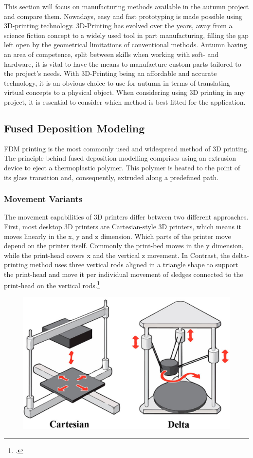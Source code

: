 This section will focus on manufacturing methods available in the autumn project and compare them. Nowadays, easy and fast prototyping is made possible using 3D-printing technology. 3D-Printing has evolved over the years, away from a science fiction concept to a widely used tool in part manufacturing, filling the gap left open by the geometrical limitations of conventional methods.\newline
Autumn having an area of competence, split between skills when working with soft- and hardware, it is vital to have the means to manufacture custom parts tailored to the project's needs. With 3D-Printing being an affordable and accurate technology, it is an obvious choice to use for autumn in terms of translating virtual concepts to a physical object.
When considering using 3D printing in any project, it is essential to consider which method is best fitted for the application.

\subsection{Fused Deposition Modeling}

FDM printing is the most commonly used and widespread method of 3D printing. The principle behind fused deposition modelling comprises using an extrusion device to eject a thermoplastic polymer. This polymer is heated to the point of its glass transition and, consequently, extruded along a predefined path.

\subsubsection{Movement Variants}

The movement capabilities of 3D printers differ between two different approaches. First, most desktop 3D printers are Cartesian-style 3D printers, which means it moves linearly in the x, y and z dimension.
Which parts of the printer move depend on the printer itself. Commonly the print-bed moves in the y dimension, while the print-head covers x and the vertical z movement. In Contrast, the delta-printing method uses three vertical rods aligned in a triangle shape to support the print-head and move it per individual movement of sledges connected to the print-head on the vertical rods.\footcite{all3dpFDM3DPrinting2020}\newline

\begin{figure}[h]
	\centering
	\includegraphics[width=0.6\linewidth]{img/cartesianDeltaPrinting}
	\caption{}
	\label{fig:custom_parts_printerMovement}
\end{figure}

